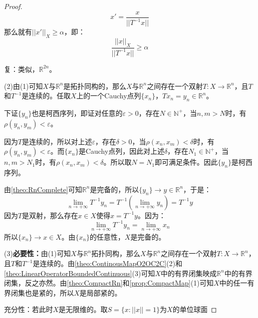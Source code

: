\begin{proof}
	\begin{equation*}
		x'=\frac{x}{||T^{-1}x||}
	\end{equation*}
	那么就有$||x'||_X\geqslant\alpha$，即：
	\begin{equation*}
		\frac{||x||_X}{||T^{-1}x||}\geqslant\alpha
	\end{equation*}\par
	复：类似，$\mathbb{R}^{2n}$。\par
	(2)由(1)可知$X$与$\mathbb{R}^{n}$是拓扑同构的，那么$X$与$\mathbb{R}^{n}$之间存在一个双射$T:X\rightarrow\mathbb{R}^{n}$，且$T$和$T^{-1}$是连续的。任取$X$上的一个Cauchy点列$\{x_n\}$，$Tx_n=y_n\in\mathbb{R}^{n}$。\par 
	下证$\{y_n\}$也是柯西序列，即证对任意的$\varepsilon>0$，存在$N\in\mathbb{N}^+$，当$n,m>N$时，有$\rho(y_n,y_m)<\varepsilon$。\par
	因为$T$是连续的，所以对上述$\varepsilon$，存在$\delta>0$，当$\rho(x_n,x_m)<\delta$时，有$\rho(y_n,y_m)<\varepsilon$。而$\{x_n\}$是Cauchy点列，因此对上述$\delta$，存在$N_1\in\mathbb{N}^+$，当$n,m>N_1$时，有$\rho(x_n,x_m)<\delta$。所以取$N=N_1$即可满足条件。因此$\{y_n\}$是柯西序列。\par
	由\cref{theo:RnComplete}可知$\mathbb{R}^{n}$是完备的，所以$\{y_n\}\rightarrow y\in\mathbb{R}^{n}$，于是：
	\begin{equation*}
		\lim_{n\to+\infty}T^{-1}y_n=T^{-1}\left(\lim_{n\to+\infty}y_n\right)=T^{-1}y
	\end{equation*}
	因为$T$是双射，那么存在$x\in X$使得$x=T^{-1}y$。因为：
	\begin{equation*}
		\lim_{n\to+\infty}T^{-1}y_n=\lim_{n\to+\infty}x_n
	\end{equation*}
	所以$\{x_n\}\rightarrow x\in X$。由$\{x_n\}$的任意性，$X$是完备的。\par
	(3)\textbf{必要性：}由(1)可知$X$与$\mathbb{R}^{n}$拓扑同构，那么$X$与$\mathbb{R}^{n}$之间存在一个双射$T:X\rightarrow\mathbb{R}^{n}$，且$T$和$T^{-1}$是连续的。由\cref{theo:ContinousMapO2OC2C}(2)和\cref{theo:LinearOperatorBoundedContinuous}(3)可知$X$中的有界闭集映成$\mathbb{R}^{n}$中的有界闭集，反之亦然。由\cref{theo:CompactRn}和\cref{prop:CompactMap}(1)可知$X$中的任一有界闭集也是紧的，所以$X$是局部紧的。\par
	充分性：若此时$X$是无限维的。取$S=\{x:||x||=1\}$为$X$的单位球面
\end{proof}

